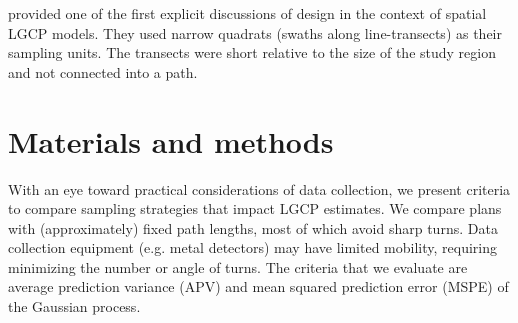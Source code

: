 \documentclass[review]{elsarticle}
\begin{document}
\citet{liuvanhatalo} provided one of the first explicit discussions of design
in the context of spatial LGCP models. They used narrow quadrats (swaths along
line-transects) as their sampling units. The transects were short relative to
the size of the study region and not connected into a path.







\section{Materials and methods}


With an eye toward practical considerations of data collection, we present
criteria to compare sampling strategies that impact LGCP estimates. We compare
plans with (approximately) fixed path lengths, most of which avoid sharp turns.
Data collection equipment (e.g. metal detectors) may have limited mobility,
requiring minimizing the number or angle of turns. The criteria that we
evaluate are average prediction variance (APV) and mean squared prediction
error (MSPE) of the Gaussian process.
\end{document}
